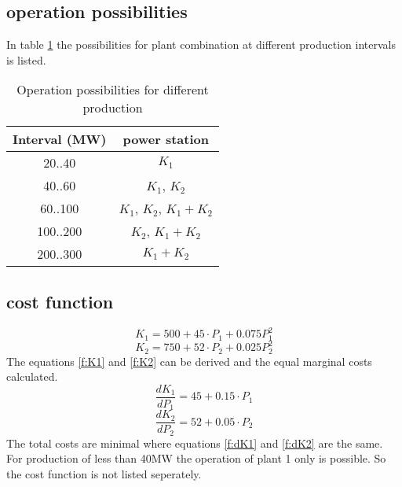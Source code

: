 \documentclass{article}
\begin{document}
	\subsection{operation possibilities}
In table \ref{tab:oppos} the possibilities for plant combination at different production intervals is listed.
	\begin{table}[h!]
\begin{center}
\begin{tabular}[h]{|c|c|}
\hline 
Interval (MW) & power station\\ \hline
20..40 & $K_1$\\
40..60 & $K_1$, $K_2$\\
60..100 & $K_1$, $K_2$, $K_1+K_2$\\
100..200 & $K_2$, $K_1+K_2$\\
200..300 & $K_1+K_2$\\
\hline
\end{tabular}
\caption{Operation possibilities for different production}\label{tab:oppos}
\end{center}
\end{table}

\subsection{cost function}
	\begin{equation}
		K_1=500+45\cdot P_1 + 0.075 P_1^2
		\label{f:K1}
	\end{equation}
	\begin{equation}
		K_2=750+52\cdot P_2 + 0.025 P_2^2
		\label{f:K2}
	\end{equation}
The equations \ref{f:K1} and \ref{f:K2} can be derived and the equal marginal costs calculated.
	\begin{equation}
		\frac{dK_1}{dP_1}=45+0.15\cdot P_1
		\label{f:dK1}
	\end{equation}
	\begin{equation}
		\frac{dK_2}{dP_2}=52+0.05\cdot P_2
		\label{f:dK2}
	\end{equation}
	The total costs are minimal where equations \ref{f:dK1} and \ref{f:dK2} are the same. For production of less than 40MW the operation of plant 1 only is possible. So the cost function is not listed seperately.
\end{document}
